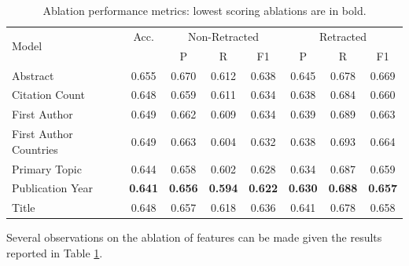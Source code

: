 \documentclass[pdflatex,sn-mathphys-num]{sn-jnl}
\begin{document}
\begin{table}[htbp]
	\caption{Ablation performance metrics: lowest scoring ablations are in bold.}\label{tab:ablation}
	\small
	\begin{tabular}{l*{7}{c}}
		\toprule
		\multirow{2}{*}{Model} & \multirow{1}{*}{Acc.} & \multicolumn{3}{c}{Non-Retracted} & \multicolumn{3}{c}{Retracted}                                                                     \\
		\cmidrule(lr){3-5} \cmidrule(lr){6-8}
		                       &                       & P                                 & R                             & F1             & P              & R              & F1             \\
		\midrule
		Abstract               & 0.655                 & 0.670                             & 0.612                         & 0.638          & 0.645          & 0.678          & 0.669          \\
		Citation Count         & 0.648                 & 0.659                             & 0.611                         & 0.634          & 0.638          & 0.684          & 0.660          \\
		First Author           & 0.649                 & 0.662                             & 0.609                         & 0.634          & 0.639          & 0.689          & 0.663          \\
		First Author Countries & 0.649                 & 0.663                             & 0.604                         & 0.632          & 0.638          & 0.693          & 0.664          \\
		Primary Topic          & 0.644                 & 0.658                             & 0.602                         & 0.628          & 0.634          & 0.687          & 0.659          \\
		Publication Year       & \textbf{0.641}        & \textbf{0.656}                    & \textbf{0.594}                & \textbf{0.622} & \textbf{0.630} & \textbf{0.688} & \textbf{0.657} \\
		Title                  & 0.648                 & 0.657                             & 0.618                         & 0.636          & 0.641          & 0.678          & 0.658          \\
		\bottomrule
	\end{tabular}
\end{table}


Several observations on the ablation of features can be made given the results reported in Table \ref{tab:ablation}.
\end{document}

